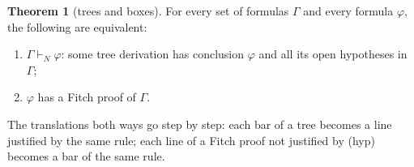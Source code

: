 \documentclass[a4paper, 11pt]{article}
\theoremstyle{definition}
\newtheorem{theorem}[definition]{Theorem}
\begin{document}
\begin{theorem}[trees and boxes]
    For every set of formulas $\Gamma$ and every formula $\varphi$, the following are equivalent:
    \begin{enumerate}
        \item $\Gamma \vdash_N \varphi$: some tree derivation has conclusion $\varphi$ and all its open hypotheses in
        $\Gamma$;
        \item $\varphi$ has a Fitch proof of $\Gamma$.
    \end{enumerate}
    The translations both ways go step by step: each bar of a tree becomes a line justified by the same rule; each line 
    of a Fitch proof not justified by (hyp) becomes a bar of the same rule.
\end{theorem}
\end{document}
